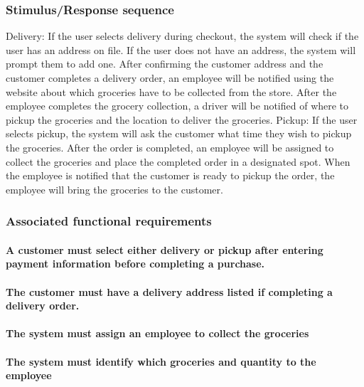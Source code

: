 \documentclass{scrreprt}
\theoremstyle{funreq}
\begin{document}
	\subsubsection{Stimulus/Response sequence}
	Delivery: If the user selects delivery during checkout, the system will check if the user has an address on file.  If the user does not have an address, the system will prompt them to add one.  After confirming the customer address and the customer completes a delivery order, an employee will be notified using the website about which groceries have to be collected from the store.  After the employee completes the grocery collection, a driver will be notified of where to pickup the groceries and the location to deliver the groceries.
	Pickup: If the user selects pickup, the system will ask the customer what time they wish to pickup the groceries.  After the order is completed, an employee will be assigned to collect the groceries and place the completed order in a designated spot.  When the employee is notified that the customer is ready to pickup the order, the employee will bring the groceries to the customer.
	
	\subsubsection{Associated functional requirements}
	
	\paragraph[]{\normalfont A customer must select either delivery or pickup after entering payment information before completing a purchase.}
	
	\paragraph[]{\normalfont The customer must have a delivery address listed if completing a delivery order.}
	\paragraph[]{\normalfont The system must assign an employee to collect the groceries}
	\paragraph[]{\normalfont The system must identify which groceries and quantity to the employee}
	~\\
	
\end{document}
